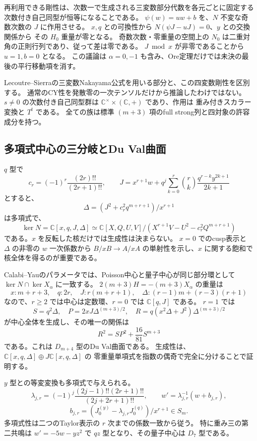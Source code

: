 再利用できる剛性は、次数一で生成される三変数部分代数を各元ごとに固定する
次数付き自己同型が恒等になることである。
$\psi(w)=uw+b$ を、$N$ 不変な奇数次数の $J$ に作用させる。
$x,q$ との可換性から $N(\psi J-uJ)=0$、$y$ との交換関係から
その $H_0$ 重量が零となる。
奇数次数・零重量の空間上の $N_0$ は二重対角の正則行列であり、従って差は零である。
$J\bmod x$ が非零であることから $u=1,b=0$ となる。
この議論は $\alpha=0,-1$ も含み、Ore定理だけでは未決の最後の平行移動項を消す。

Lecoutre--Sierraの三変数Nakayama公式を用いる部分と、この四変数剛性を区別する。
通常のCY性を発散零の一次テンソルだけから推論したわけではない。
$s\ne0$ の次数付き自己同型群は
$\mathbb C^\times\times(\mathbb C,+)$ であり、作用は
重み付きスカラー変換と $T^t$ である。
全ての族は標準 $(m+3)$ 項のfull strong列と四対象の許容成分を持つ。

\subsection{多項式中心の三分岐とDu Val曲面}

$q$ 型で
\[
 c_r=(-1)^r\frac{(2r)!!}{(2r+1)!!},\qquad
 J=x^{r+1}w+q^j\sum_{k=0}^r\binom rk\frac{q^{r-k}y^{2k+1}}{2k+1}
\]
とすると、
\[
 \Delta=(J^2+c_r^2q^{m+r+1})/x^{r+1}
\]
は多項式で、
\[
 \ker N=\mathbb C[x,q,J,\Delta]
 \simeq\mathbb C[X,Q,U,V]/(X^{r+1}V-U^2-c_r^2Q^{m+r+1})
\]
である。$x$ を反転した核だけでは生成性は決まらない。
$x=0$ でのcusp表示と $\Delta$ の非零の $w$ 一次係数から
$B/xB\to A/xA$ の単射性を示し、$x$ に関する飽和で核全体を得るのが重要である。

Calabi--Yauのパラメータでは、Poisson中心と量子中心が同じ部分環として
$\ker N\cap\ker X_\alpha$ に一致する。
$2(m+3)H=- (m+3)X_\alpha$ の重量は
\[
 x:m+r+3,\quad q:2r,\quad J:r(m+r+1),\quad
 \Delta:(r-1)m+(r-3)(r+1)
\]
なので、$r\ge2$ では中心は定数環、$r=0$ では $\mathbb C[q,J]$ である。
$r=1$ では
\[
 S=q^2\Delta,\quad P=2xJ\Delta^{(m+3)/2},\quad
 R=q(x^2\Delta+J^2)\Delta^{(m+3)/2}
\]
が中心全体を生成し、その唯一の関係は
\[
 \boxed{R^2=SP^2+\frac{16}{81}S^{m+3}}
\]
である。これは $D_{m+4}$ 型のDu Val曲面である。
生成性は、$\mathbb C[x,q,\Delta]\oplus J\mathbb C[x,q,\Delta]$ の
零重量単項式を指数の偶奇で完全に分けることで証明する。

$y$ 型との等変変換も多項式で与えられる。
\[
 \lambda_{j,r}=(-1)^j\frac{(2j-1)!!(2r+1)!!}{(2j+2r+1)!!},\qquad
 w'=\lambda_{j,r}^{-1}(w+b_{j,r}),
\]
\[
 b_{j,r}=(J_0^{(y)}-\lambda_{j,r}J_0^{(q)})/x^{r+1}\in S_m.
\]
多項式性は二つのTaylor表示の $r$ 次までの係数一致から従う。
特に重み三の第二共鳴は $w'=-5w-yz^2$ で $qz$ 型となり、その量子中心は $D_7$ 型である。

